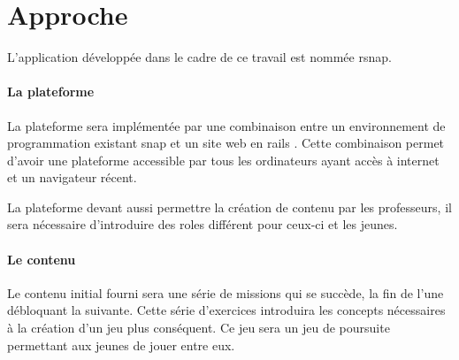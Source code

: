 ﻿\section{Approche}
\label{intro-approche}
L'application développée dans le cadre de ce travail est nommée \gls{rsnap}.

\paragraph{La plateforme} La plateforme sera implémentée par une combinaison entre un environnement de programmation existant \gls{snap} \cite{snap} et un site web en \gls{rails} \cite{rails}. Cette combinaison permet d'avoir une plateforme accessible par tous les ordinateurs ayant accès à internet et un navigateur récent.

La plateforme devant aussi permettre la création de contenu par les professeurs, il sera nécessaire d'introduire des \glspl{role} différent pour ceux-ci et les jeunes.

\paragraph{Le contenu} Le contenu initial fourni sera une série de \glspl{mission} qui se succède, la fin de l'une débloquant la suivante. Cette série d'exercices introduira les concepts nécessaires à la création d'un jeu plus conséquent. Ce jeu sera un jeu de poursuite permettant aux jeunes de jouer entre eux.
